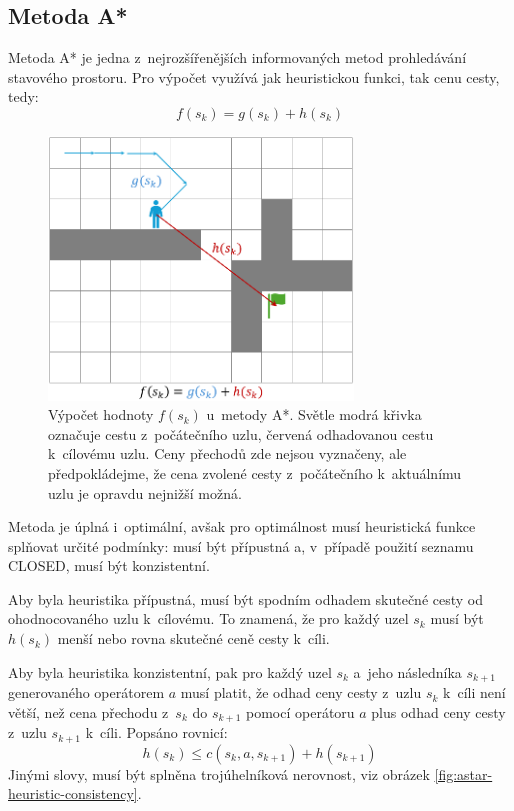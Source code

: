 \subsection{Metoda A*}

Metoda A* je jedna z~nejrozšířenějších informovaných metod prohledávání stavového prostoru. Pro výpočet využívá jak heuristickou funkci, tak cenu cesty, tedy:
\[f(s_k) = g(s_k) + h(s_k)\]
\begin{figure}
    \centering
    \includegraphics[height=7cm]{doc/obrazky-figures/astar-fsk-example.png}
    \caption{Výpočet hodnoty ${f(s_k)}$ u~metody A*. Světle modrá křivka označuje cestu z~počátečního uzlu, červená odhadovanou cestu k~cílovému uzlu. Ceny přechodů zde nejsou vyznačeny, ale předpokládejme, že cena zvolené cesty z~počátečního k~aktuálnímu uzlu je opravdu nejnižší možná.}
    \label{fig:astar-fsk-example}
\end{figure}

Metoda je úplná i~optimální, avšak pro optimálnost musí heuristická funkce splňovat určité podmínky: musí být přípustná a, v~případě použití seznamu CLOSED, musí být konzistentní. 

Aby byla heuristika přípustná, musí být spodním odhadem skutečné cesty od ohodnocovaného uzlu k~cílovému. To znamená, že pro každý uzel $s_k$ musí být ${h(s_k)}$ menší nebo rovna skutečné ceně cesty k~cíli.

Aby byla heuristika konzistentní, pak pro každý uzel $s_k$ a~jeho následníka $s_{k+1}$ generovaného operátorem $a$ musí platit, že odhad ceny cesty z~uzlu $s_k$ k~cíli není větší, než cena přechodu z~$s_k$ do $s_{k+1}$ pomocí operátoru $a$ plus odhad ceny cesty z~uzlu $s_{k+1}$ k~cíli. Popsáno rovnicí:
\[h(s_k) \le c(s_k, a, s_{k+1}) + h(s_{k+1})\]
Jinými slovy, musí být splněna trojúhelníková nerovnost, viz obrázek \ref{fig:astar-heuristic-consistency}.

